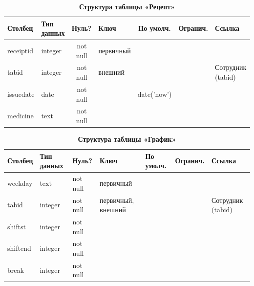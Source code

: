 \documentclass[14pt,a4paper,russian]{extreport}
\begin{document}
\begin{table}[h!]
    \caption{ } 
    \begin{subtable}[t]{\textwidth}
        \caption{\textbf{Структура таблицы «Рецепт»}}
    \begin{tabularx}{\textwidth}{| X | X | c | X | c | c | X |}
        \hline
        \textbf{Столбец} & \textbf{Тип данных} & \textbf{Нуль?} & \textbf{Ключ} & \textbf{По
        умолч.} & \textbf{Огранич.} & \textbf{Ссылка} \\ \hline
	    receiptid & integer & not null & первичный & & & \\ \hline
            tabid & integer & not null & внешний & & & Сотрудник (tabid) \\ \hline
            issuedate & date & not null & & date('now') & & \\ \hline
        medicine & text & not null & & & & \\ \hline
    \end{tabularx}
    \end{subtable}
    \label{table:receipt}
\end{table}

\begin{table}[h!]
    \caption{ } 
    \begin{subtable}[t]{\textwidth}
        \caption{\textbf{Структура таблицы «График»}}
    \begin{tabularx}{\textwidth}{| X | X | X | X | X | X | X |}
        \hline
        \textbf{Столбец} & \textbf{Тип данных} & \textbf{Нуль?} & \textbf{Ключ} & \textbf{По
        умолч.} & \textbf{Огранич.} & \textbf{Ссылка} \\ \hline
        weekday & text & not null & первичный & & & \\ \hline
        tabid & integer & not null & первичный, внешний & & & Сотрудник (tabid) \\ \hline
        shiftst & integer & not null & & & & \\ \hline
        shiftend & integer & not null & & & & \\ \hline
        break & integer & not null & & & & \\ \hline
    \end{tabularx}
    \end{subtable}
    \label{table:timetable}
\end{table}
\end{document}
